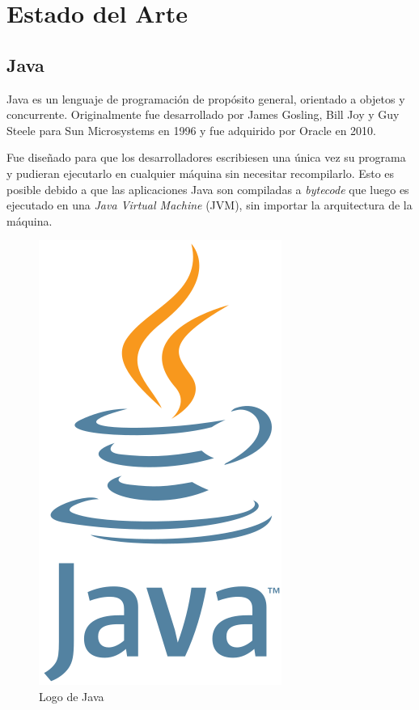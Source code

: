 
\chapter{Estado del Arte} %

\label{Chapter3}


\section{Java}

Java es un lenguaje de programación de propósito general, orientado a objetos y concurrente. Originalmente fue desarrollado por James Gosling, Bill Joy y Guy Steele para Sun Microsystems en 1996 y fue adquirido por Oracle en 2010.

Fue diseñado para que los desarrolladores escribiesen una única vez su programa y pudieran ejecutarlo en cualquier máquina sin necesitar recompilarlo. Esto es posible debido a que las aplicaciones Java son compiladas a \emph{bytecode} que luego es ejecutado en una \emph{Java Virtual Machine} (JVM), sin importar la arquitectura de la máquina. \emph{\parencite{Reference13}}

\begin{figure}[ht]
  \centering
  \includegraphics[scale=0.3]{Figures/JavaLogo}
  \decoRule
  \caption[Java (Logo)]{Logo de Java \emph{\parencite{Reference6}}}
  \label{fig:JavaLogo}
\end{figure}

